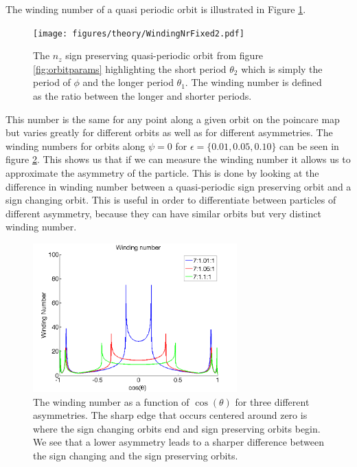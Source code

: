 \noindent The winding number of a quasi periodic orbit is illustrated in Figure \ref{fig:windingDef}.

\begin{figure}[H]
\begin{center}
\texttt{[image: figures/theory/WindingNrFixed2.pdf]}
\end{center}
\caption{The $n_z$ sign preserving quasi-periodic orbit from figure \ref{fig:orbitparams} highlighting the short period $\theta_2$ which is simply the period of $\phi$ and the longer period $\theta_1$. The winding number is defined as the ratio between the longer and shorter periods.}
\label{fig:windingDef}
\end{figure}

This number is the same for any point along a given orbit on the poincare map but varies greatly for different orbits as well as for different asymmetries. The winding numbers for orbits along $\psi=0$ for $\epsilon=\{0.01, 0.05, 0.10\}$ can be seen in figure \ref{fig:windingdifferent}. This shows us that if we can measure the winding number it allows us to approximate the asymmetry of the particle.  This is done by looking at the difference in winding number between a quasi-periodic sign preserving orbit and a sign changing orbit. This is useful in order to differentiate between particles of different asymmetry, because they can have similar orbits but very distinct winding number. 
 
\begin{figure}[H]
\begin{center}
\includegraphics[width=0.7\textwidth]{figures/theory/WindingTrend.png}
\end{center}
\caption{The winding number as a function of $\cos(\theta)$ for three different asymmetries. The sharp edge that occurs centered around zero is where the sign changing orbits end and sign preserving orbits begin. We see that a lower asymmetry leads to a sharper difference between the sign changing and the sign preserving orbits.}
\label{fig:windingdifferent}
\end{figure}
